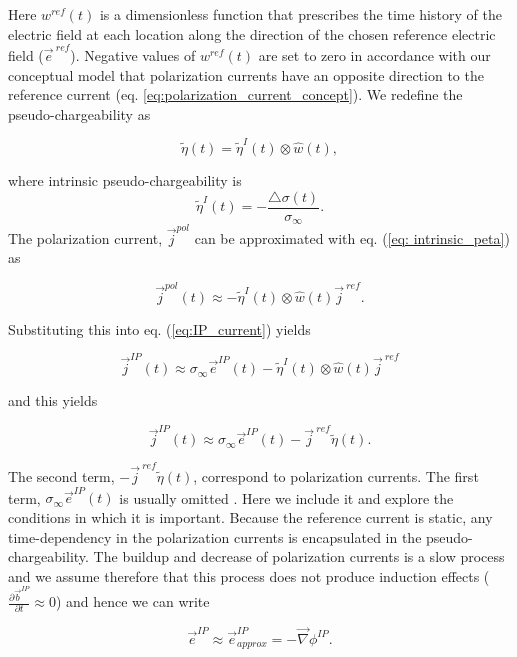 \documentclass[letterpaper,11pt]{article}
\newcommand{\grad}{\vec \nabla}
\newcommand{\siginf}{\sigma_\infty}
\newcommand{\dsig}{\triangle\sigma}
\renewcommand {\j}  { {\vec j} }
\renewcommand {\b}  { {\vec b} }
\newcommand {\e}  { {\vec e} }
\newcommand{\peta}{\tilde{\eta}}
\newcommand{\eref}{\e^{\ ref}}
\newcommand{\jref}{\j^{\ ref}}
\begin{document}
Here $w^{ref}(t)$ is a dimensionless function that prescribes the time history of the electric field at each location along the direction of the chosen reference electric field ($\eref$).  Negative values of  $w^{ref}(t)$ are set to zero in accordance with our conceptual model that polarization currents have an opposite direction to the reference current (eq. \ref{eq:polarization_current_concept}).
We redefine the pseudo-chargeability as
\begin{linenomath*}
\begin{equation}
    \peta(t) = \peta^{I}(t)\otimes \hat{w}(t),
    \label{eq: pseudochargeability}
\end{equation}
\end{linenomath*}
where intrinsic pseudo-chargeability is 
\begin{equation}
  \peta^{I}(t) = -\frac{\dsig(t)}{\siginf}.
  \label{eq: intrinsic_peta}
\end{equation}
The polarization current, $\j^{pol}$ can be approximated with eq. (\ref{eq: intrinsic_peta}) as
\begin{linenomath*}
\begin{equation}
  \j^{pol}(t) \approx - \peta^{I}(t)\otimes \hat{w}(t)\jref.
\end{equation}
\end{linenomath*}
Substituting this into eq. (\ref{eq:IP_current}) yields
\begin{linenomath*}
\begin{equation}
  \j^{IP}(t) \approx \siginf\e^{IP}(t) - \peta^{I}(t)\otimes \hat{w}(t)\jref
\end{equation}
\end{linenomath*}
and this yields
\begin{linenomath*}
\begin{equation}
  \j^{IP}(t) \approx \siginf\e^{IP}(t) -\jref\peta(t).
  \label{eq: jip_EMIP}
\end{equation}
\end{linenomath*}

The second term, $-\jref\peta(t)$, correspond to polarization currents. The first term, $\siginf \e^{IP}(t)$ is usually omitted \cite[]{Smith1988a}. Here we include it and explore the conditions in which it is important. 
Because the reference current is static, any time-dependency in the polarization currents is encapsulated in the pseudo-chargeability. The buildup and decrease of polarization currents is a slow process and we assume therefore that this process does not produce induction effects ($\frac{\partial \b^{IP}}{\partial t} \approx 0$) and hence we can write 
\begin{linenomath*}
\begin{equation}
  \e^{IP} \approx  \e^{IP}_{approx} = -\grad\phi^{IP}.
  \label{eq: eip_approx}
\end{equation}
\end{linenomath*}
\end{document}
